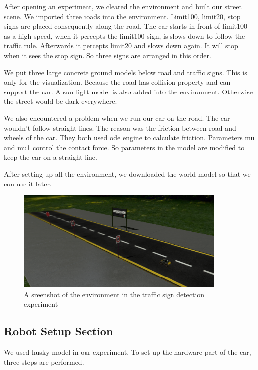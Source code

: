 After opening an experiment, we cleared the environment and built our street scene. We imported three roads into the environment. Limit100, limit20, stop signs are placed consequently along the road. The car starts in front of limit100 as a high speed, when it percepts the limit100 sign, is slows down to follow the traffic rule. Afterwards it percepts limit20 and slows down again. It will stop when it sees the stop sign. So three signs are arranged in this order.


We put three large concrete ground models below road and traffic signs. This is only for the visualization. Because the road has collision property and can support the car. A sun light model is also added into the environment. Otherwise the street would be dark everywhere.

We also encountered a problem when we run our car on the road. The car wouldn't follow straight lines. The reason was the friction between road and wheels of the car. They both used ode engine to calculate friction. Parameters mu and mu1 control the contact force. So parameters in the model are modified to keep the car on a straight line. 

After setting up all the environment, we downloaded the world model so that we can use it later.


\begin{figure}
  \centering
  \includegraphics[width=0.9\textwidth]{chapter/images/img-3.png}
  \caption{A sreenshot of the environment in the traffic sign detection experiment}
  \label{fig:img}
\end{figure}


\subsection{Robot Setup Section}

We used husky model in our experiment. To set up the hardware part of the car, three steps are performed.


